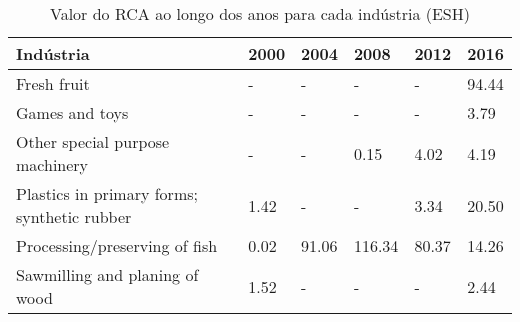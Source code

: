 \begin{table}
\centering
\caption{Valor do RCA ao longo dos anos para cada indústria (ESH)}
\begin{tabular}{p{6cm}p{1.5cm}p{1.5cm}p{1.5cm}p{1.5cm}p{1.5cm}}
\toprule
                                  Indústria & 2000 &  2004 &   2008 &  2012 &  2016 \\
\midrule
                                Fresh fruit &    - &     - &      - &     - & 94.44 \\
                             Games and toys &    - &     - &      - &     - &  3.79 \\
            Other special purpose machinery &    - &     - &   0.15 &  4.02 &  4.19 \\
Plastics in primary forms; synthetic rubber & 1.42 &     - &      - &  3.34 & 20.50 \\
              Processing/preserving of fish & 0.02 & 91.06 & 116.34 & 80.37 & 14.26 \\
             Sawmilling and planing of wood & 1.52 &     - &      - &     - &  2.44 \\
\bottomrule
\end{tabular}
\end{table}

